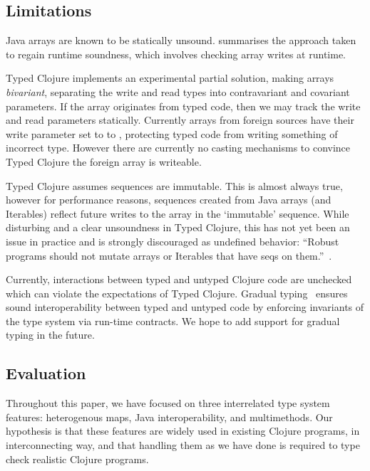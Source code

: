 \subsection{Limitations}
Java arrays are known to be statically unsound.
\citet{Bra98} summarises the approach taken to regain runtime soundness, which involves
checking array writes at runtime.

Typed Clojure implements an experimental partial solution, making arrays \emph{bivariant},
separating the write and read types into contravariant and covariant parameters.
If the array originates from typed code, then we may track the write and read
parameters statically. Currently arrays from foreign sources
have their write parameter set to to \Bot{}, protecting typed code from writing
something of incorrect type. However there are currently no casting mechanisms to 
convince Typed Clojure the foreign array is writeable.

Typed Clojure assumes sequences are immutable. This is almost always true, however
for performance reasons,
sequences created from Java arrays (and Iterables) reflect future writes to the array 
in the `immutable' sequence. While disturbing and a clear unsoundness in Typed Clojure,
this has not yet been an issue in practice and is strongly discouraged as undefined behavior:
``Robust programs should not mutate arrays or Iterables that have seqs on them.''~\cite{CljSeqDoc}.

Currently, interactions between typed and untyped Clojure code are unchecked
which can violate the expectations of Typed Clojure.
Gradual typing~\cite{thf06,siek06} ensures sound interoperability between typed and untyped code by enforcing
invariants of the type system via run-time contracts.
 We hope to add support
for gradual typing in the future.

\subsection{Evaluation}
\label{sec:casestudy}

Throughout this paper, we have focused on three interrelated type
system features: heterogenous maps, Java interoperability, and
multimethods. Our hypothesis is that these features are widely used in
existing Clojure programs, in interconnecting way, and that handling
them as we have done is required to type check realistic Clojure
programs.

